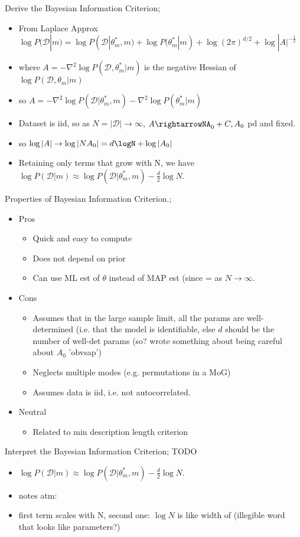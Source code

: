 \documentclass{article}
\begin{document}
Derive the Bayesian Information Criterion; \begin{itemize} \item From Laplace Approx $\log P(\mathcal{D}|m)=\log P(\mathcal{D}|\theta^*_m, m) + \log P(\theta^*_m|m) + \log (2\pi)^{d/2} + \log|A|^{-\frac{1}{2}}$ \item where $A=-\nabla^2\log P(\mathcal{D},\theta^*_m|m)$ is the negative Hessian of $\log P(\mathcal{D},\theta_m|m)$ \item so $A=-\nabla^2\log P(\mathcal{D}|\theta^*_m,m) -\nabla^2\log P(\theta^*_m|m)$ \item Dataset is iid, so as $N=|\mathcal{D}|\rightarrow\infty$, $A\rightarrowNA_0+C, A_0$ pd and fixed.  \item so $\log|A|\rightarrow\log|NA_0|=d\logN+\log|A_0|$ \item Retaining only terms that grow with N, we have $\log P(\mathcal{D}|m)\approx \log P(\mathcal{D}|\theta^*_m, m)-\frac{d}{2}\log N$.  \end{itemize}

Properties of Bayesian Information Criterion.; \begin{itemize} \item Pros \begin{itemize} \item Quick and easy to compute \item Does not depend on prior \item Can use ML est of $\theta$ instead of MAP est (since = as $N\rightarrow\infty$.  \end{itemize} \item Cons \begin{itemize} \item Assumes that in the large sample limit, all the params are well-determined (i.e. that the model is identifiable, else $d$ should be the number of well-det params (so? wrote something about being careful about $A_0$ 'obvsap') \item Neglects multiple modes (e.g. permutations in a MoG) \item Assumes data is iid, i.e. not autocorrelated.  \end{itemize} \item Neutral \begin{itemize} \item Related to min description length criterion \end{itemize} \end{itemize}

Interpret the Bayesian Information Criterion; TODO \begin{itemize} \item $\log P(\mathcal{D}|m)\approx \log P(\mathcal{D}|\theta^*_m, m)-\frac{d}{2}\log N$.  \item notes atm: \item first term scales with N, second one: $\log N$ is like width of (illegible word that looks like parameters?) \end{itemize}
\end{document}

